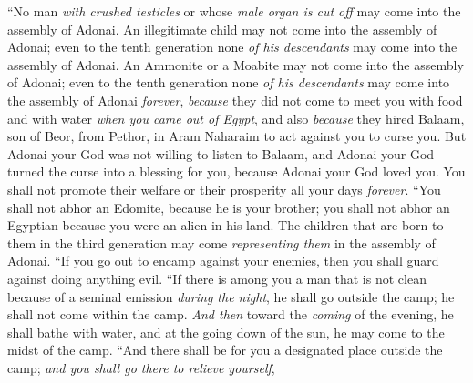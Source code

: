 \begin{biblechapter} %
\verse “No man \textit{with crushed testicles} or whose \textit{male organ is cut off} may come into the assembly of Adonai.
\verse An illegitimate child may not come into the assembly of Adonai; even to the tenth generation none \textit{of his descendants} may come into the assembly of Adonai.
\verse An Ammonite or a Moabite may not come into the assembly of Adonai; even to the tenth generation none \textit{of his descendants} may come into the assembly of Adonai \textit{forever},
\verse \textit{because} they did not come to meet you with food and with water \textit{when you came out of Egypt}, and also \textit{because} they hired Balaam, son of Beor, from Pethor, in Aram Naharaim to act against you to curse you.
\verse But Adonai your God was not willing to listen to Balaam, and Adonai your God turned the curse into a blessing for you, because Adonai your God loved you.
\verse You shall not promote their welfare or their prosperity all your days \textit{forever}.
\verse “You shall not abhor an Edomite, because he is your brother; you shall not abhor an Egyptian because you were an alien in his land.
\verse The children that are born to them in the third generation may come \textit{representing them} in the assembly of Adonai.
\verse “If you go out to encamp against your enemies, then you shall guard against doing anything evil.
\verse “If there is among you a man that is not clean because of a seminal emission \textit{during the night}, he shall go outside the camp; he shall not come within the camp.
\verse \textit{And then} toward the \textit{coming} of the evening, he shall bathe with water, and at the going down of the sun, he may come to the midst of the camp.
\verse “And there shall be for you a designated place outside the camp; \textit{and you shall go there to relieve yourself},

\end{biblechapter}
